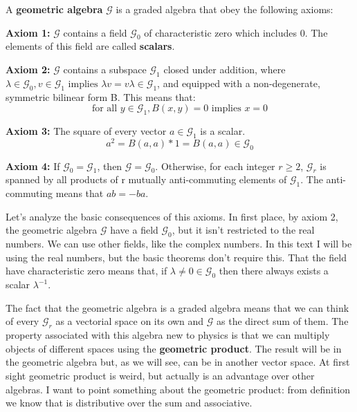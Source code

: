 \begin{definition}
A \textbf{geometric algebra} $\mathcal{G}$ is a graded algebra that obey the following axioms:

\hfill\newline \hfill\newline

\textbf{Axiom 1:} $\mathcal{G}$ contains a field $\mathcal{G}_0$ of characteristic zero which includes 0. The elements of this field are called \textbf{scalars}.

\hfill\newline

\textbf{Axiom 2:} $\mathcal{G}$ contains a subspace $\mathcal{G}_1$ closed under addition, where $\lambda \in \mathcal{G}_0, v \in \mathcal{G}_1 \mbox{ implies } \lambda v = v \lambda \in \mathcal{G}_1$, and equipped with a non-degenerate, symmetric bilinear form B. This means that:
\begin{equation*}
\mbox{for all } y  \in \mathcal{G}_1, B(x,y) = 0 \mbox{ implies } x=0
\end{equation*}

\hfill\newline

\textbf{Axiom 3:} The square of every vector $a \in \mathcal{G}_1$ is a scalar.
\begin{equation*}
a^2 = B(a,a)*1 = B(a,a) \in \mathcal{G}_0
\end{equation*}

\hfill\newline

\textbf{Axiom 4:}  If $\mathcal{G}_0 = \mathcal{G}_1$, then $\mathcal{G} = \mathcal{G}_0$. Otherwise, for each integer $r \ge 2$, $\mathcal{G}_r$ is spanned by all products of r mutually anti-commuting elements of $\mathcal{G}_1$. The anti-commuting means that $ab = -ba$.

\end{definition}

Let's analyze the basic consequences of this axioms. In first place, by axiom 2, the geometric algebra $\mathcal{G}$ have a field $\mathcal{G}_0$, but it isn't restricted to the real numbers. We can use other fields, like the complex numbers\cite{sobczyk12}. In this text I will be using the real numbers, but the basic theorems don't require this. That the field have characteristic zero means that, if $\lambda \not = 0 \in \mathcal{G}_0$ then there always exists a scalar $\lambda^{-1}$. 

The fact that the geometric algebra is a graded algebra means that we can think of every $\mathcal{G}_r$ as a vectorial space on its own and $\mathcal{G}$ as the direct sum of them. The property associated with this algebra new to physics is that we can multiply objects of different spaces using the \textbf{geometric product}. The result will be in the geometric algebra but, as we will see, can be in another vector space. At first sight geometric product is weird, but actually is an advantage over other algebras. I want to point something about the geometric product: from definition we know that is distributive over the sum and associative.

